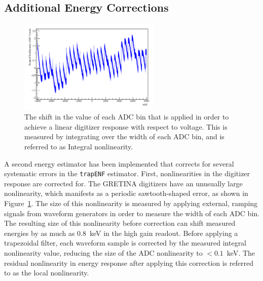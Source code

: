 \documentclass[/main.tex]{subfiles}
\begin{document}
\subsection{Additional Energy Corrections} \label{sec:energy}
\begin{figure}
  \centering
  \includegraphics[width=0.6\textwidth]{dignonlin}
  \caption[Integral digitizer nonlinearity]{\label{fig:localnonlin}
    The shift in the value of each ADC bin that is applied in order to achieve a linear digitizer response with respect to voltage. This is measured by integrating over the width of each ADC bin, and is referred to as Integral nonlinearity.
  }
\end{figure}
A second energy estimator has been implemented that corrects for several systematic errors in the \texttt{trapENF} estimator\cite{energyunidoc}.
First, nonlinearities in the digitizer response are corrected for.
The GRETINA digitizers have an unusually large nonlinearity, which manifests as a periodic sawtooth-shaped error, as shown in Figure~\ref{fig:localnonlin}.
The size of this nonlinearity is measured by applying external, ramping signals from waveform generators in order to measure the width of each ADC bin.
The resulting size of this nonlinearity before correction can shift measured energies by as much as 0.8~keV in the high gain readout.
Before applying a trapezoidal filter, each waveform sample is corrected by the measured integral nonlinearity value, reducing the size of the ADC nonlinearity to $<0.1$~keV.
The residual nonlinearity in energy response after applying this correction is referred to as the local nonlinearity.
\end{document}
